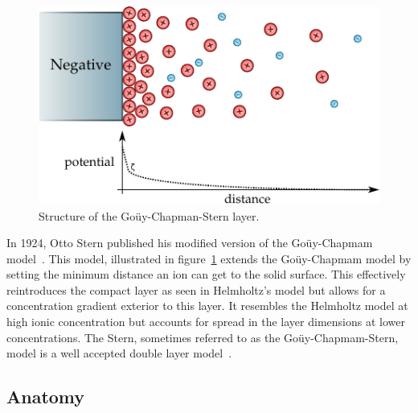     \begin{figure}
      \begin{center}
        \includegraphics{content/introduction/graphics/model_stern}
      \end{center}
      \caption{Structure of the Goüy-Chapman-Stern layer.}
      \label{fig:doubleLayerModel_stern}
    \end{figure}
    In 1924, Otto Stern published his modified version of the Goüy-Chapmam model~\cite{Stern1924}.
    This model, illustrated in figure~\ref{fig:doubleLayerModel_stern} extends the Goüy-Chapmam model by setting the minimum distance an ion can get to the solid surface.
    This effectively reintroduces the compact layer as seen in Helmholtz's model but allows for a concentration gradient exterior to this layer.
    It resembles the Helmholtz model at high ionic concentration but accounts for spread in the layer dimensions at lower concentrations.
    The Stern, sometimes referred to as the Goüy-Chapmam-Stern, model is a well accepted double layer model~\cite{Olthuis2005}.


  \subsection{Anatomy}
    \label{sub:backgound_doubleLayers_anatomy}


